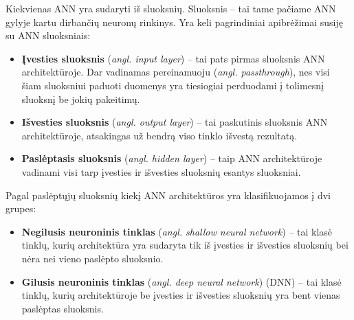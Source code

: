 \documentclass{VUMIFPSbakalaurinis}
\begin{document}
{
	Kiekvienas ANN yra sudaryti iš sluoksnių. Sluoksnis -- tai tame pačiame ANN gylyje kartu dirbančių neuronų rinkinys. Yra keli pagrindiniai apibrėžimai susiję su ANN sluoksniais: 
	
	\begin{itemize}
		\item \textbf{Įvesties sluoksnis} (\textit{angl. input layer}) -- tai pats pirmas sluoksnis ANN architektūroje. Dar vadinamas pereinamuoju (\textit{angl. passthrough}), nes visi šiam sluoksniui paduoti duomenys yra tiesiogiai perduodami į tolimesnį sluoksnį be jokių pakeitimų.
		
		\item \textbf{Išvesties sluoksnis} (\textit{angl. output layer}) -- tai paskutinis sluoksnis ANN architektūroje, atsakingas už bendrą viso tinklo išvestą rezultatą.
		
		\item \textbf{Paslėptasis sluoksnis} (\textit{angl. hidden layer}) -- taip ANN architektūroje vadinami visi tarp įvesties ir išvesties sluoksnių esantys sluoksniai.
	\end{itemize}
	
	Pagal paslėptųjų sluoksnių kiekį ANN architektūros yra klasifikuojamos į dvi grupes:
	
	\begin{itemize}
		\item \textbf{Negilusis neuroninis tinklas} (\textit{angl. shallow neural network}) -- tai klasė tinklų, kurių architektūra yra sudaryta tik iš įvesties ir išvesties sluoksnių bei nėra nei vieno paslėpto sluoksnio.
		
		\item \textbf{Gilusis neuroninis tinklas} (\textit{angl. deep neural network}) (DNN) -- tai klasė tinklų, kurių architektūroje be įvesties ir išvesties sluoksnių yra bent vienas paslėptas sluoksnis.
\end{itemize}
}
\end{document}
